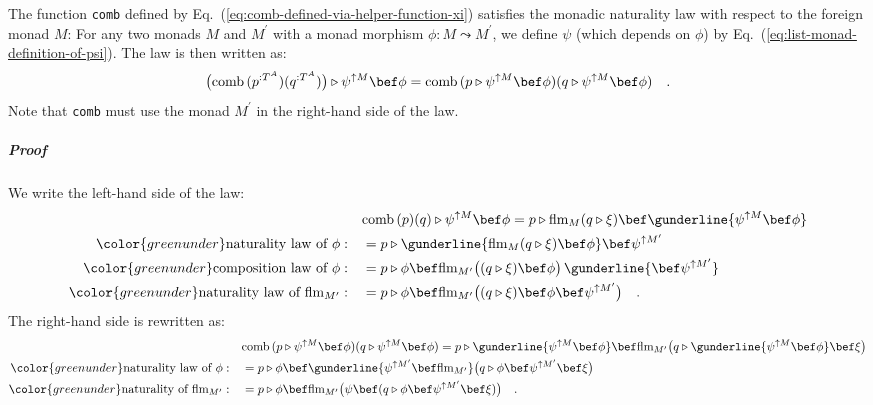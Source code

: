 The function \lstinline!comb! defined by Eq.~(\ref{eq:comb-defined-via-helper-function-xi})
satisfies the monadic naturality law with respect to the foreign monad
$M$: For any two monads $M$ and $M^{\prime}$ with a monad morphism
$\phi:M\leadsto M^{\prime}$, we define $\psi$ (which depends on
$\phi$) by Eq.~(\ref{eq:list-monad-definition-of-psi}). The law
is then written as:
\[
\big(\text{comb}\,(p^{:T^{A}})(q^{:T^{A}})\big)\triangleright\psi^{\uparrow M}\bef\phi=\text{comb}\,(p\triangleright\psi^{\uparrow M}\bef\phi)(q\triangleright\psi^{\uparrow M}\bef\phi)\quad.
\]
Note that \lstinline!comb! must use the monad $M^{\prime}$ in the
right-hand side of the law.

\subparagraph{Proof}

We write the left-hand side of the law:
\begin{align*}
 & \text{comb}\,(p)(q)\triangleright\psi^{\uparrow M}\bef\phi=p\triangleright\text{flm}_{M}(q\triangleright\xi)\bef\gunderline{\psi^{\uparrow M}\bef\phi}\\
{\color{greenunder}\text{naturality law of }\phi:}\quad & =p\triangleright\gunderline{\text{flm}_{M}(q\triangleright\xi)\bef\phi}\bef\psi^{\uparrow M^{\prime}}\\
{\color{greenunder}\text{composition law of }\phi:}\quad & =p\triangleright\phi\bef\text{flm}_{M^{\prime}}\big((q\triangleright\xi)\bef\phi\big)\,\gunderline{\bef\psi^{\uparrow M^{\prime}}}\\
{\color{greenunder}\text{naturality law of }\text{flm}_{M^{\prime}}:}\quad & =p\triangleright\phi\bef\text{flm}_{M^{\prime}}\big((q\triangleright\xi)\bef\phi\bef\psi^{\uparrow M^{\prime}}\big)\quad.
\end{align*}
The right-hand side is rewritten as:
\begin{align*}
 & \text{comb}\,(p\triangleright\psi^{\uparrow M}\bef\phi)(q\triangleright\psi^{\uparrow M}\bef\phi)=p\triangleright\gunderline{\psi^{\uparrow M}\bef\phi}\bef\text{flm}_{M^{\prime}}\big(q\triangleright\gunderline{\psi^{\uparrow M}\bef\phi}\bef\xi\big)\\
{\color{greenunder}\text{naturality law of }\phi:}\quad & =p\triangleright\phi\bef\gunderline{\psi^{\uparrow M^{\prime}}\bef\text{flm}_{M^{\prime}}}\big(q\triangleright\phi\bef\psi^{\uparrow M^{\prime}}\bef\xi\big)\\
{\color{greenunder}\text{naturality of }\text{flm}_{M^{\prime}}:}\quad & =p\triangleright\phi\bef\text{flm}_{M^{\prime}}\big(\psi\bef(q\triangleright\phi\bef\psi^{\uparrow M^{\prime}}\bef\xi)\big)\quad.
\end{align*}
